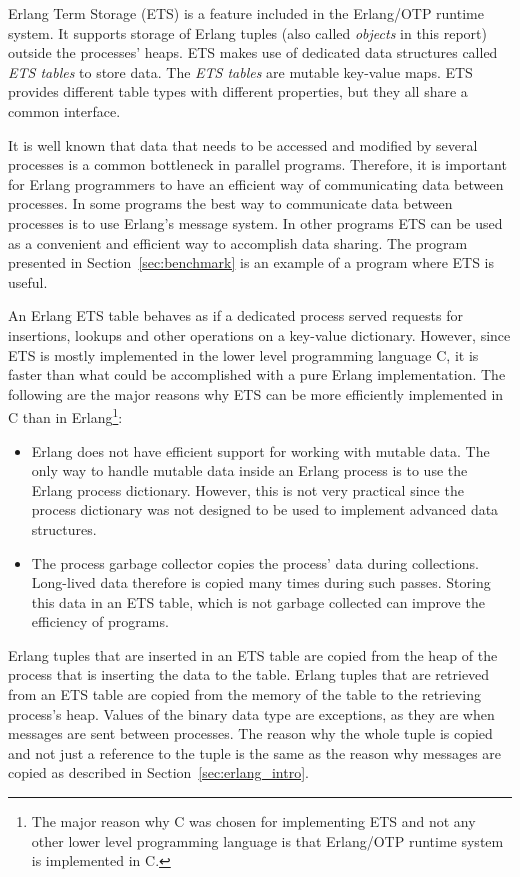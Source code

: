 \documentclass[aps,pre,preprint,nofootinbib]{revtex4}
\begin{document}
Erlang Term Storage (ETS) is a feature included in the Erlang/OTP runtime system.
It supports storage of Erlang tuples (also called \emph{objects} in this report) outside the processes' heaps.
ETS makes use of dedicated data structures called \emph{ETS tables} to store data.
The \emph{ETS tables} are mutable key-value maps.
ETS provides different table types with different properties, but they all share a common interface.

It is well known that data that needs to be accessed and modified by several processes is a common bottleneck in parallel programs.
Therefore, it is important for Erlang programmers to have an efficient way of communicating data between processes.
In some programs the best way to communicate data between processes is to use Erlang's message system.
In other programs ETS can be used as a convenient and efficient way to accomplish data sharing. 
The program presented in Section~\ref{sec:benchmark} is an example of a program where ETS is useful.

An Erlang ETS table behaves as if a dedicated process served requests for insertions, lookups and other operations on a key-value dictionary.
However, since ETS is mostly implemented in the lower level programming language C, it is faster than what could be accomplished with a pure Erlang implementation.
The following are the major reasons why ETS can be more efficiently implemented in C than in Erlang\footnote{The major reason why C was chosen for implementing ETS and not any other lower level programming language is that Erlang/OTP runtime system is implemented in C.}:
\begin{itemize}
\item
Erlang does not have efficient support for working with mutable data.
The only way to handle mutable data inside an Erlang process is to use the Erlang process dictionary.
However, this is not very practical since the process dictionary was not designed to be used to implement advanced data structures.
\item 
The process garbage collector copies the process' data during collections.
Long-lived data therefore is copied many times during such passes. 
Storing this data in an ETS table, which is not garbage collected can improve the efficiency of programs.
\end{itemize}

Erlang tuples that are inserted in an ETS table are copied from the heap of the process that is inserting the data to the table.
Erlang tuples that are retrieved from an ETS table are copied from the memory of the table to the retrieving process's heap.
Values of the binary data type are exceptions, as they are when messages are sent between processes.
The reason why the whole tuple is copied and not just a reference to the tuple is the same as the reason why messages are copied as described in Section~\ref{sec:erlang_intro}.
\end{document}

